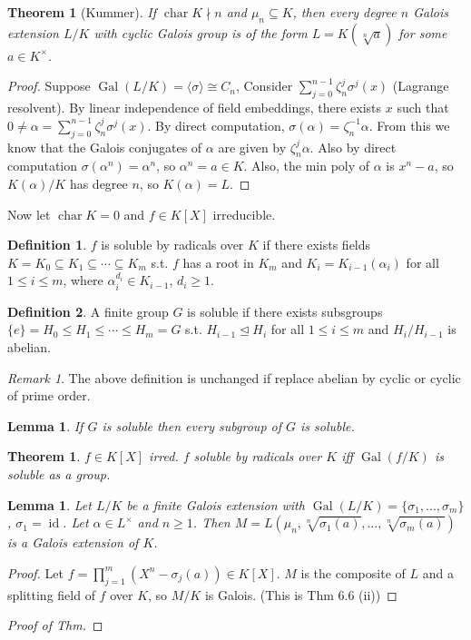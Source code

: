 \documentclass{article}
\theoremstyle{definition}
\newtheorem*{defn*}{Definition}
\theoremstyle{remark}
\newtheorem{rem}{Remark}
\theoremstyle{plain}
\newtheorem{lem}[defn]{Lemma}
\newtheorem{thm}[defn]{Theorem}
\newcommand{\Gal}{\operatorname{Gal}}
\begin{document}
\begin{thm}[Kummer]
    If $\operatorname{char}K\nmid n$ and $\mu_n\subseteq K$, then every degree $n$ Galois extension $L/K$ with cyclic Galois group is of the form $L=K(\sqrt[n]a)$ for some $a\in K^\times$.
\end{thm}
\begin{proof}
    Suppose $\Gal(L/K)=\langle\sigma\rangle\cong C_n$, Consider $\sum_{j=0}^{n-1}\zeta_n^j\sigma^j(x)$ (Lagrange resolvent). By linear independence of field embeddings, there exists $x$ such that $0\neq \alpha=\sum_{j=0}^{n-1}\zeta_n^j\sigma^j(x)$. By direct computation, $\sigma(\alpha)=\zeta_n^{-1}\alpha$. From this we know that the Galois conjugates of $\alpha$ are given by $\zeta_n^j\alpha$. Also by direct computation $\sigma(\alpha^n)=\alpha^n$, so $\alpha^n=a\in K$. Also, the min poly of $\alpha$ is $x^n-a$, so $K(\alpha)/K$ has degree $n$, so $K(\alpha)=L$.
\end{proof}

Now let $\operatorname{char}K=0$ and $f\in K[X]$ irreducible.
\begin{defn*}
    $f$ is soluble by radicals over $K$ if there exists fields $K=K_0\subseteq K_1\subseteq \cdots\subseteq K_m$ s.t. $f$ has a root in $K_m$ and $K_i=K_{i-1}(\alpha_i)$ for all $1\le i\le m$, where $\alpha_i^{d_i}\in K_{i-1}$, $d_i\ge 1$.
\end{defn*}
\begin{defn*}
    A finite group $G$ is soluble if there exists subsgroups $\{e\}=H_0\le H_1\le \cdots\le H_m=G$ s.t. $H_{i-1}\trianglelefteq H_i$ for all $1\le i\le m$ and $H_i/H_{i-1}$ is abelian.
\end{defn*}
\begin{rem}
    The above definition is unchanged if replace abelian by cyclic or cyclic of prime order.
\end{rem}
\begin{lem}
    If $G$ is soluble then every subgroup of $G$ is soluble.
\end{lem}
\begin{thm}
    $f\in K[X]$ irred. $f$ soluble by radicals over $K$ iff $\Gal(f/K)$ is soluble as a group.
\end{thm}
\begin{lem}
    Let $L/K$ be a finite Galois extension with $\Gal(L/K)=\{\sigma_1,...,\sigma_m\}$, $\sigma_1=\operatorname{id}$. Let $\alpha\in L^\times$ and $n\ge 1$. Then $M=L(\mu_n,\sqrt[n]{\sigma_1(a)},\ldots,\sqrt[n]{\sigma_m(a)})$ is a Galois extension of $K$.
\end{lem}
\begin{proof}
    Let $f=\prod_{j=1}^m(X^n-\sigma_j(a))\in K[X]$. $M$ is the composite of $L$ and a splitting field of $f$ over $K$, so $M/K$ is Galois. (This is Thm 6.6 (ii))
\end{proof}
\begin{proof}[Proof of Thm]
    
\end{proof}
\end{document}
